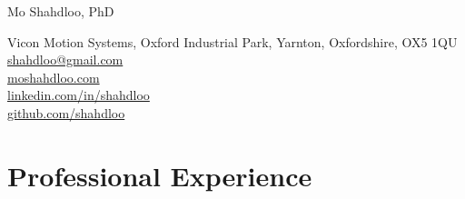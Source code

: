 \documentclass[10pt, a4paper]{article}
\begin{document}
{\huge Mo Shahdloo, PhD}\\[0.5cm]

\begin{multicols}{2}
{\small
 Vicon Motion Systems, Oxford Industrial Park, \newline
Yarnton, Oxfordshire, OX5 1QU}\\
[3cm]
{\scriptsize{}} \quad\href{mailto:shahdloo@gmail.com}{\small shahdloo@gmail.com}\\
{\scriptsize{}} \quad\href{http://moshahdloo.com}{\small moshahdloo.com}\\
{\scriptsize{}} \quad\href{http://linkedin.com/in/shahdloo}{\small linkedin.com/in/shahdloo}\\
{\scriptsize{}} \quad\href{http://github.com/shahdloo}{\small github.com/shahdloo}\\

\end{multicols}

\hypersetup{linkcolor=blue,citecolor=blue,filecolor=black,urlcolor=darkgray}
\section*{Professional Experience}
\end{document}
